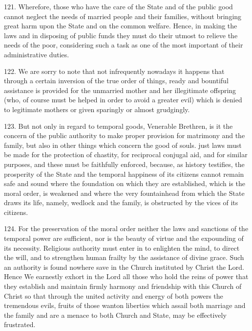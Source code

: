 \documentclass[12pt,a4paper]{book}
\begin{document}
121. Wherefore, those who have the care of the State and of the public good cannot neglect the needs of married people and their families, without bringing great harm upon the State and on the common welfare. Hence, in making the laws and in disposing of public funds they must do their utmost to relieve the needs of the poor, considering such a task as one of the most important of their administrative duties.

122. We are sorry to note that not infrequently nowadays it happens that through a certain inversion of the true order of things, ready and bountiful assistance is provided for the unmarried mother and her illegitimate offspring (who, of course must be helped in order to avoid a greater evil) which is denied to legitimate mothers or given sparingly or almost grudgingly.

123. But not only in regard to temporal goods, Venerable Brethren, is it the concern of the public authority to make proper provision for matrimony and the family, but also in other things which concern the good of souls. just laws must be made for the protection of chastity, for reciprocal conjugal aid, and for similar purposes, and these must be faithfully enforced, because, as history testifies, the prosperity of the State and the temporal happiness of its citizens cannot remain safe and sound where the foundation on which they are established, which is the moral order, is weakened and where the very fountainhead from which the State draws its life, namely, wedlock and the family, is obstructed by the vices of its citizens.

124. For the preservation of the moral order neither the laws and sanctions of the temporal power are sufficient, nor is the beauty of virtue and the expounding of its necessity. Religious authority must enter in to enlighten the mind, to direct the will, and to strengthen human frailty by the assistance of divine grace. Such an authority is found nowhere save in the Church instituted by Christ the Lord. Hence We earnestly exhort in the Lord all those who hold the reins of power that they establish and maintain firmly harmony and friendship with this Church of Christ so that through the united activity and energy of both powers the tremendous evils, fruits of those wanton liberties which assail both marriage and the family and are a menace to both Church and State, may be effectively frustrated.
\end{document}
